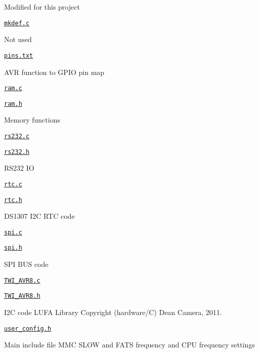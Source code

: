 \begin{DoxyItemize}
\begin{DoxyItemize}
\begin{DoxyItemize}
\begin{DoxyItemize}
\item Modified for this project
\end{DoxyItemize}
\end{DoxyItemize}
\item \href{hardware/mkdef.c}{\tt mkdef.\+c}
\begin{DoxyItemize}
\item Not used
\end{DoxyItemize}
\item \href{hardware/pins.txt}{\tt pins.\+txt}
\begin{DoxyItemize}
\item A\+VR function to G\+P\+IO pin map
\end{DoxyItemize}
\item \href{hardware/ram.c}{\tt ram.\+c}
\item \href{hardware/ram.h}{\tt ram.\+h}
\begin{DoxyItemize}
\item Memory functions
\end{DoxyItemize}
\item \href{hardware/rs232.c}{\tt rs232.\+c}
\item \href{hardware/rs232.h}{\tt rs232.\+h}
\begin{DoxyItemize}
\item R\+S232 IO
\end{DoxyItemize}
\item \href{hardware/rtc.c}{\tt rtc.\+c}
\item \href{hardware/rtc.h}{\tt rtc.\+h}
\begin{DoxyItemize}
\item D\+S1307 I2C R\+TC code
\end{DoxyItemize}
\item \href{hardware/spi.c}{\tt spi.\+c}
\item \href{hardware/spi.h}{\tt spi.\+h}
\begin{DoxyItemize}
\item S\+PI B\+US code
\end{DoxyItemize}
\item \href{hardware/TWI_AVR8.c}{\tt T\+W\+I\+\_\+\+A\+V\+R8.\+c}
\item \href{hardware/TWI_AVR8.h}{\tt T\+W\+I\+\_\+\+A\+V\+R8.\+h}
\begin{DoxyItemize}
\item I2C code L\+U\+FA Library Copyright (hardware/C) Dean Camera, 2011.
\end{DoxyItemize}
\item \href{hardware/user_config.h}{\tt user\+\_\+config.\+h}
\begin{DoxyItemize}
\item Main include file M\+MC S\+L\+OW and F\+A\+TS frequency and C\+PU frequency settings
\end{DoxyItemize}
\end{DoxyItemize}
\end{DoxyItemize}

